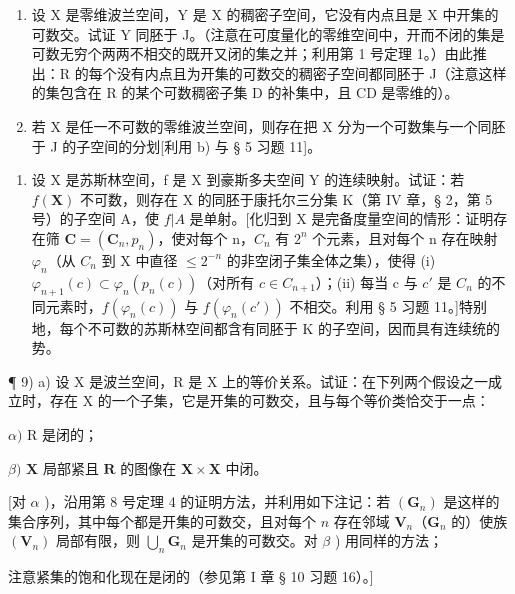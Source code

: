 \begin{enumerate}
\def\labelenumi{\alph{enumi})}
\setcounter{enumi}{1}
\item
  设 X 是零维波兰空间，Y 是 X 的稠密子空间，它没有内点且是 X 中开集的可数交。试证 Y 同胚于 J。（注意在可度量化的零维空间中，开而不闭的集是可数无穷个两两不相交的既开又闭的集之并；利用第 1 号定理 1。）由此推出：R 的每个没有内点且为开集的可数交的稠密子空间都同胚于 J（注意这样的集包含在 R 的某个可数稠密子集 D 的补集中，且 CD 是零维的）。
\item
  若 X 是任一不可数的零维波兰空间，则存在把 X 分为一个可数集与一个同胚于 J 的子空间的分划{[}利用 b) 与 § 5 习题 11{]}。
\end{enumerate}

\begin{enumerate}
\def\labelenumi{\arabic{enumi})}
\setcounter{enumi}{7}
\tightlist
\item
  设 X 是苏斯林空间，f 是 X 到豪斯多夫空间 Y 的连续映射。试证：若 \(f(\mathbf{X})\) 不可数，则存在 X 的同胚于康托尔三分集 K（第 IV 章，§ 2，第 5 号）的子空间 A，使 \(f|A\) 是单射。{[}化归到 X 是完备度量空间的情形：证明存在筛 \(\mathbf{C} = (\mathbf{C}_{n}, p_{n})\)，使对每个 n，\(C_{n}\) 有 \(2^{n}\) 个元素，且对每个 n 存在映射 \(\varphi_{n}\)（从 \(C_{n}\) 到 X 中直径 \(\leqslant 2^{-n}\) 的非空闭子集全体之集），使得 (i) \(\varphi_{n+1}(c) \subset \varphi_{n}(p_{n}(c))\)（对所有 \(c \in C_{n+1}\)）；(ii) 每当 c 与 \(c'\) 是 \(C_{n}\) 的不同元素时，\(f(\varphi_{n}(c))\) 与 \(f(\varphi_{n}(c'))\) 不相交。利用 § 5 习题 11。{]}特别地，每个不可数的苏斯林空间都含有同胚于 K 的子空间，因而具有连续统的势。
\end{enumerate}

¶ 9) a) 设 X 是波兰空间，R 是 X 上的等价关系。试证：在下列两个假设之一成立时，存在 X 的一个子集，它是开集的可数交，且与每个等价类恰交于一点：

\(\alpha)\) R 是闭的；

\(\beta)\) \(\mathbf{X}\) 局部紧且 \(\mathbf{R}\) 的图像在 \(\mathbf{X} \times \mathbf{X}\) 中闭。

{[}对 \(\alpha\) )，沿用第 8 号定理 4 的证明方法，并利用如下注记：若 \((\mathbf{G}_n)\) 是这样的集合序列，其中每个都是开集的可数交，且对每个 \(n\) 存在邻域 \(\mathbf{V}_n\)（\(\mathbf{G}_n\) 的）使族 \((\mathbf{V}_n)\) 局部有限，则 \(\bigcup_{n} \mathbf{G}_n\) 是开集的可数交。对 \(\beta\) ) 用同样的方法；

注意紧集的饱和化现在是闭的（参见第 I 章 § 10 习题 16）。{]}


